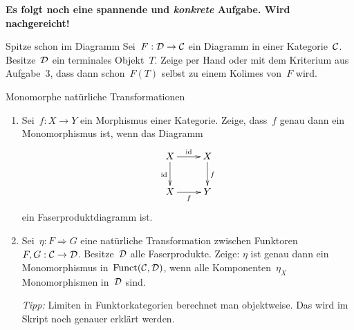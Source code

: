\documentclass{pizzablatt}
\begin{document}

\textbf{Es folgt noch eine spannende und \emph{konkrete} Aufgabe. Wird
nachgereicht!}

\begin{aufgabe}{Spitze schon im Diagramm}
Sei~$F:\mathcal{D} \to \mathcal{C}$ ein Diagramm in einer Kategorie~$\mathcal{C}$. Besitze~$\mathcal{D}$ ein
terminales Objekt~$T$.
Zeige per Hand oder mit dem Kriterium aus Aufgabe~3, dass dann
schon~$F(T)$ selbst zu einem Kolimes von~$F$ wird.
\end{aufgabe}

\begin{aufgabe}{Monomorphe natürliche Transformationen}
\begin{enumerate}
\item Sei~$f:X \to Y$ ein Morphismus einer Kategorie. Zeige, dass~$f$ genau
dann ein Monomorphismus ist, wenn das Diagramm
\[ \xymatrix{
  X \ar[r]^\id \ar[d]_\id & X \ar[d]^f \\
  X \ar[r]_f & Y
} \]
ein Faserproduktdiagramm ist.
\item Sei~$\eta : F \Rightarrow G$ eine natürliche Transformation zwischen
Funktoren $F, G : \mathcal{C} \to \mathcal{D}$. Besitze~$\mathcal{D}$ alle Faserprodukte. Zeige: $\eta$
ist genau dann ein Monomorphismus in~$\mathrm{Funct}(\mathcal{C},\mathcal{D})$, wenn alle
Komponenten~$\eta_X$ Monomorphismen in~$\mathcal{D}$ sind.

\emph{Tipp:} Limiten in Funktorkategorien berechnet man objektweise.
Das wird im Skript noch genauer erklärt werden.
\end{enumerate}
\end{aufgabe}
\end{document}
